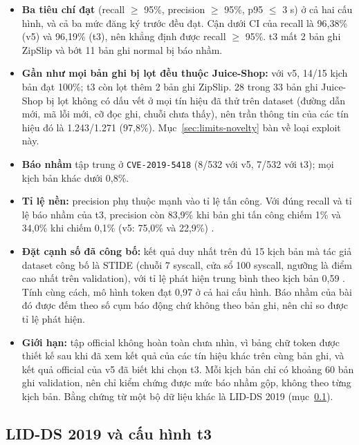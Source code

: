 \begin{itemize}
\tightlist
\item
  \textbf{Ba tiêu chí đạt} (recall $\geq$ 95\%, precision $\geq$ 95\%, p95 $\leq$ 3 s) ở cả hai cấu hình, và cả ba mức đăng ký trước đều đạt. Cận dưới CI của recall là 96,38\% (v5) và 96,19\% (t3), nên khẳng định được recall $\geq$ 95\%. t3 mất 2 bản ghi ZipSlip và bớt 11 bản ghi normal bị báo nhầm.
\item
  \textbf{Gần như mọi bản ghi bị lọt đều thuộc Juice-Shop:} với v5, 14/15 kịch bản đạt 100\%; t3 còn lọt thêm 2 bản ghi ZipSlip. 28 trong 33 bản ghi Juice-Shop bị lọt không có dấu vết ở mọi tín hiệu đã thử trên dataset (đường dẫn mới, mã lỗi mới, cỡ đọc ghi, chuỗi chưa thấy), nên trần thông tin của các tín hiệu đó là 1.243/1.271 (97,8\%). Mục~\ref{sec:limits-novelty} bàn về loại exploit này.
\item
  \textbf{Báo nhầm} tập trung ở \texttt{CVE-\allowbreak{}2019-\allowbreak{}5418} (8/532 với v5, 7/532 với t3); mọi kịch bản khác dưới 0,8\%.
\item
  \textbf{Tỉ lệ nền:} precision phụ thuộc mạnh vào tỉ lệ tấn công. Với đúng recall và tỉ lệ báo nhầm của t3, precision còn 83,9\% khi bản ghi tấn công chiếm 1\% và 34,0\% khi chiếm 0,1\% (v5: 75,0\% và 22,9\%) \citep{arp2022}.
\item
  \textbf{Đặt cạnh số đã công bố:} kết quả duy nhất trên đủ 15 kịch bản mà tác giả dataset công bố là STIDE (chuỗi 7 syscall, cửa sổ 100 syscall, ngưỡng là điểm cao nhất trên validation), với tỉ lệ phát hiện trung bình theo kịch bản 0,59 \citep{grimmer2022}. Tính cùng cách, mô hình token đạt 0,97 ở cả hai cấu hình. Báo nhầm của bài đó được đếm theo số cụm báo động chứ không theo bản ghi, nên chỉ so được tỉ lệ phát hiện.
\item
  \textbf{Giới hạn:} tập official không hoàn toàn chưa nhìn, vì bảng chữ token được thiết kế sau khi đã xem kết quả của các tín hiệu khác trên cùng bản ghi, và kết quả official của v5 đã biết khi chọn t3. Mỗi kịch bản chỉ có khoảng 60 bản ghi validation, nên chỉ kiểm chứng được mức báo nhầm gộp, không theo từng kịch bản. Bằng chứng từ một bộ dữ liệu khác là LID-DS 2019 (mục~\ref{sec:lidds2019}).
\end{itemize}

\subsection{LID-DS 2019 và cấu hình t3}\label{sec:lidds2019}

